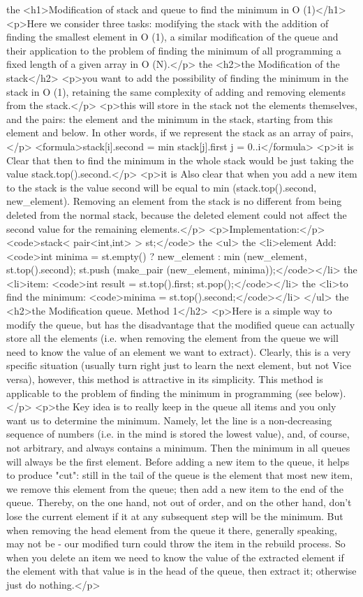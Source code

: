 the <h1>Modification of stack and queue to find the minimum in O (1)</h1>
<p>Here we consider three tasks: modifying the stack with the addition of finding the smallest element in O (1), a similar modification of the queue and their application to the problem of finding the minimum of all programming a fixed length of a given array in O (N).</p>
the <h2>the Modification of the stack</h2>
<p>you want to add the possibility of finding the minimum in the stack in O (1), retaining the same complexity of adding and removing elements from the stack.</p>
<p>this will store in the stack not the elements themselves, and the pairs: the element and the minimum in the stack, starting from this element and below. In other words, if we represent the stack as an array of pairs,</p>
<formula>stack[i].second = min { stack[j].first }
j = 0..i</formula>
<p>it is Clear that then to find the minimum in the whole stack would be just taking the value stack.top().second.</p>
<p>it is Also clear that when you add a new item to the stack is the value second will be equal to min (stack.top().second, new_element). Removing an element from the stack is no different from being deleted from the normal stack, because the deleted element could not affect the second value for the remaining elements.</p>
<p>Implementation:</p>
<code>stack< pair<int,int> > st;</code>
the <ul>
the <li>element Add:
<code>int minima = st.empty() ? new_element : min (new_element, st.top().second);
st.push (make_pair (new_element, minima));</code></li>
the <li>item:
<code>int result = st.top().first;
st.pop();</code></li>
the <li>to find the minimum:
<code>minima = st.top().second;</code></li>
</ul>
the <h2>the Modification queue. Method 1</h2>
<p>Here is a simple way to modify the queue, but has the disadvantage that the modified queue can actually store all the elements (i.e. when removing the element from the queue we will need to know the value of an element we want to extract). Clearly, this is a very specific situation (usually turn right just to learn the next element, but not Vice versa), however, this method is attractive in its simplicity. This method is applicable to the problem of finding the minimum in programming (see below).</p>
<p>the Key idea is to really keep in the queue all items and you only want us to determine the minimum. Namely, let the line is a non-decreasing sequence of numbers (i.e. in the mind is stored the lowest value), and, of course, not arbitrary, and always contains a minimum. Then the minimum in all queues will always be the first element. Before adding a new item to the queue, it helps to produce "cut": still in the tail of the queue is the element that most new item, we remove this element from the queue; then add a new item to the end of the queue. Thereby, on the one hand, not out of order, and on the other hand, don't lose the current element if it at any subsequent step will be the minimum. But when removing the head element from the queue it there, generally speaking, may not be - our modified turn could throw the item in the rebuild process. So when you delete an item we need to know the value of the extracted element if the element with that value is in the head of the queue, then extract it; otherwise just do nothing.</p>
